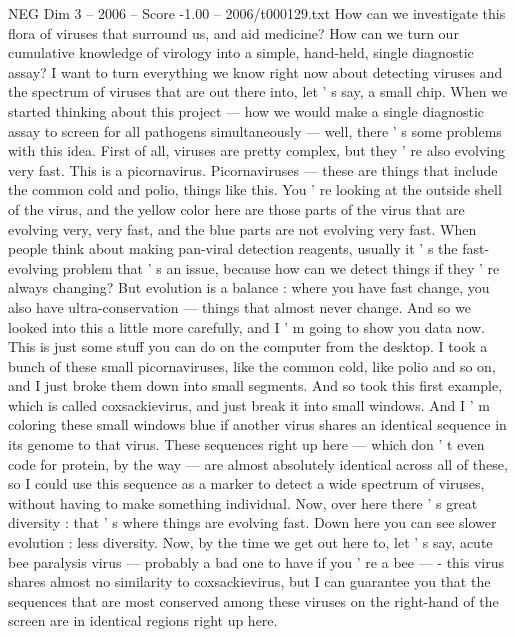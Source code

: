 \begin{textsample}{NEG Dim 3 – 2006 – Score -1.00 – 2006/t000129.txt}  \label{ex:f3_neg_017}
How can we investigate this flora of viruses that surround us, and aid medicine?
How can we turn our cumulative knowledge of virology into a simple, hand-held, single diagnostic assay?
I want to turn everything we know right now about detecting viruses and the spectrum of viruses that are out there into, let ' s say, a small chip.
When we started thinking about this project — how we would make a single diagnostic assay to screen for all pathogens simultaneously — well, there ' s some problems with this idea.
First of all, viruses are pretty complex, but they ' re also evolving very fast.
This is a picornavirus.
Picornaviruses — these are things that include the common cold and polio, things like this.
You ' re looking at the outside shell of the virus, and the yellow color here are those parts of the virus that are evolving very, very fast, and the blue parts are not evolving very fast.
When people think about making pan-viral detection reagents, usually it ' s the fast-evolving problem that ' s an issue, because how can we detect things if they ' re always changing?
But evolution is a balance : where you have fast change, you also have ultra-conservation — things that almost never change.
And so we looked into this a little more carefully, and I ' m going to show you data now.
This is just some stuff you can do on the computer from the desktop.
I took a bunch of these small picornaviruses, like the common cold, like polio and so on, and I just broke them down into small segments.
And so took this first example, which is called coxsackievirus, and just break it into small windows.
And I ' m coloring these small windows blue if another virus shares an identical sequence in its genome to that virus.
These sequences right up here — which don ' t even code for protein, by the way — are almost absolutely identical across all of these, so I could use this sequence as a marker to detect a wide spectrum of viruses, without having to make something individual.
Now, over here there ' s great diversity : that ' s where things are evolving fast.
Down here you can see slower evolution : less diversity.
Now, by the time we get out here to, let ' s say, acute bee paralysis virus — probably a bad one to have if you ' re a bee — - this virus shares almost no similarity to coxsackievirus, but I can guarantee you that the sequences that are most conserved among these viruses on the right-hand of the screen are in identical regions right up here.

\end{textsample}

